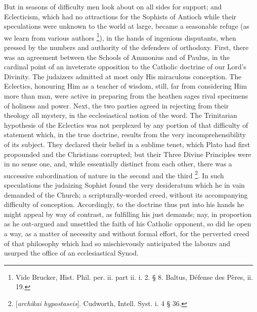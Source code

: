 But in seasons of difficulty men look about on all sides for
support; and Eclecticism, which had no attractions for the
Sophists of Antioch while their speculations were unknown to the world
at large, became a seasonable refuge (as we learn from various authors
\footnote{Vide Brucker, Hist. Phil. per. ii. part
ii. i. 2. § 8. Baltus, Défense des Pères, ii. 19.}), in the hands of
ingenious disputants, when pressed by the numbers and authority of the
defenders of orthodoxy. First, there was an agreement between the
Schools of Ammonius and of Paulus, in the cardinal point of an
inveterate opposition to the Catholic doctrine of our Lord's Divinity.
The judaizers admitted at most only His miraculous conception. The
Eclectics, honouring Him as a teacher of wisdom, still, far from
considering Him more than man, were active in preparing from the
heathen sages rival specimens of holiness and power. Next, the two
parties agreed in rejecting from their theology all mystery, in the
ecclesiastical notion of the word. The Trinitarian hypothesis of the
Eclectics was not perplexed by any portion of that difficulty of
statement which, in the true doctrine, results from the very
incomprehensibility of its subject. They declared their belief in a
sublime tenet, which Plato had first propounded and the Christians
corrupted; but their Three Divine Principles were in no sense one,
and, while essentially distinct from each other, there was a
successive subordination of nature in the second and the third \footnote{[\emph{archikai hypostaseis}]. Cudworth,
Intell. Syst. i. 4 § 36.}. In such speculations the judaizing Sophist found the very
desideratum which he in vain demanded of the Church; a scripturally-worded
creed, without its accompanying difficulty of conception. Accordingly, to the doctrine thus put into his hands he might appeal
by way of contrast, as fulfilling his just demands; nay, in proportion
as he out-argued and unsettled the faith of his Catholic opponent, so
did he open a way, as a matter of necessity and without formal effort,
for the perverted creed of that philosophy which had so mischievously
anticipated the labours and usurped the office of an ecclesiastical
Synod.

